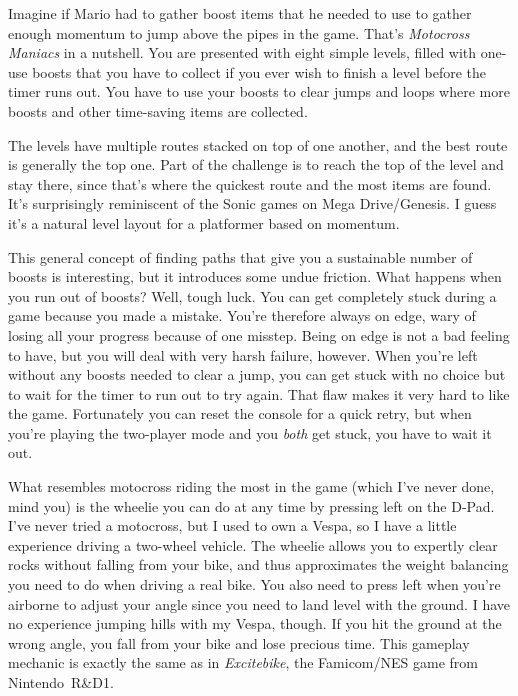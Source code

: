 \documentclass{book}
\let\oldcenter\center
\let\oldendcenter\endcenter
\renewenvironment{center}{\setlength\topsep{0pt}\oldcenter}{\oldendcenter}
\begin{document}
Imagine if Mario had to gather boost items that he needed to use to gather enough momentum to jump above the pipes in the game. That’s \emph{Motocross Maniacs} in a nutshell. You are presented with eight simple levels, filled with one-use boosts that you have to collect if you ever wish to finish a level before the timer runs out. You have to use your boosts to clear jumps and loops where more boosts and other time-saving items are collected.

The levels have multiple routes stacked on top of one another, and the best route is generally the top one. Part of the challenge is to reach the top of the level and stay there, since that’s where the quickest route and the most items are found. It’s surprisingly reminiscent of the Sonic games on Mega Drive/Genesis. I guess it’s a natural level layout for a platformer based on momentum.

\begin{center}
\quad\vspace{4pt}
\quad\vspace{4pt}
\end{center}

This general concept of finding paths that give you a sustainable number of boosts is interesting, but it introduces some undue friction. What happens when you run out of boosts? Well, tough luck. You can get completely stuck during a game because you made a mistake. You’re therefore always on edge, wary of losing all your progress because of one misstep. Being on edge is not a bad feeling to have, but you will deal with very harsh failure, however. When you’re left without any boosts needed to clear a jump, you can get stuck with no choice but to wait for the timer to run out to try again. That flaw makes it very hard to like the game. Fortunately you can reset the console for a quick retry, but when you’re playing the two-player mode and you \emph{both} get stuck, you have to wait it out.

What resembles motocross riding the most in the game (which I’ve never done, mind you) is the wheelie you can do at any time by pressing left on the D-Pad. I’ve never tried a motocross, but I used to own a Vespa, so I have a little experience driving a two-wheel vehicle. The wheelie allows you to expertly clear rocks without falling from your bike, and thus approximates the weight balancing you need to do when driving a real bike. You also need to press left when you’re airborne to adjust your angle since you need to land level with the ground. I have no experience jumping hills with my Vespa, though. If you hit the ground at the wrong angle, you fall from your bike and lose precious time. This gameplay mechanic is exactly the same as in \emph{Excitebike}, the Famicom/NES game from Nintendo~R\&D1.
\end{document}
